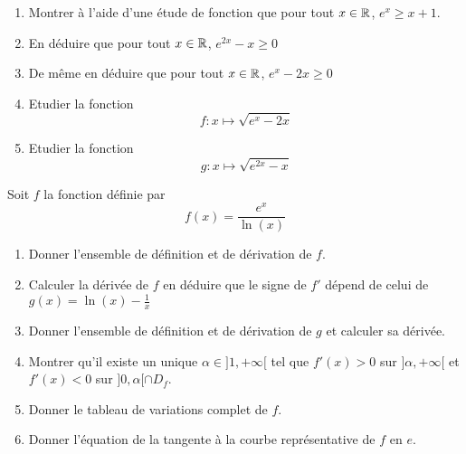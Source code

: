 \documentclass[a4paper, 11pt]{article}
\begin{document}
\begin{exercice}


\begin{enumerate}
\item Montrer à l'aide d'une étude de fonction  que pour tout $x\in \mathbb{R}$, $e^{x}\geq x+1$.
    \item En déduire que pour tout $x\in \mathbb{R}$, $e^{2x}-x\geq 0$
    \item De même en déduire que pour tout $x\in \mathbb{R}$, $e^{x}-2x\geq 0$
    \item Etudier la fonction $$f : x\mapsto \sqrt{e^{x}-2x}$$
    \item Etudier la fonction $$g : x\mapsto \sqrt{e^{2x}-x}$$
\end{enumerate}

\end{exercice}


\begin{correction}
    
\end{correction}


\begin{exercice}
Soit $f$ la fonction définie par 
$$f(x)= \frac{e^{x}}{\ln(x)} $$
\begin{enumerate}
\item Donner l'ensemble de définition et de dérivation de $f$. 
\item Calculer la dérivée de $f$ en déduire que le signe de $f'$ dépend de celui de $g(x)=\ln(x) - \frac{1}{x}$
\item Donner l'ensemble de définition et de dérivation de $g$ et calculer sa dérivée. 
\item Montrer qu'il existe un unique $\alpha\in ]1,+\infty[$ tel que $f'(x)>0$ sur $]\alpha, +\infty[$ et $f'(x)<0$ sur $]0,\alpha[\cap D_f$. 
\item Donner le tableau de variations complet de $f$. 
\item Donner l'équation de la tangente à la courbe représentative de $f$ en $e$.

\end{enumerate}
\end{exercice}
\end{document}
